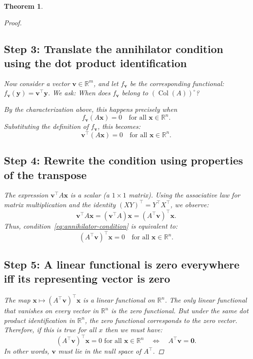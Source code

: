 \documentclass[11pt]{article}
\newcommand{\col}{\operatorname{Col}}
\newcommand{\R}{\mathbb{R}}
\newtheorem{theorem}{Theorem}
\begin{document}
\begin{theorem}
\begin{proof}
\subsection*{Step 3: Translate the annihilator condition using the dot product identification}

Now consider a vector $\mathbf{v} \in \R^m$, and let $f_{\mathbf{v}}$ be the corresponding functional: $f_{\mathbf{v}}(\mathbf{y}) = \mathbf{v}^\top \mathbf{y}$.  
We ask: \textit{When does $f_{\mathbf{v}}$ belong to $(\col(A))^\circ$?}

By the characterization above, this happens precisely when
\[
f_{\mathbf{v}}(A\mathbf{x}) = 0 \quad \text{for all } \mathbf{x} \in \R^n.
\]
Substituting the definition of $f_{\mathbf{v}}$, this becomes:
\begin{equation}
\label{eq:annihilator-condition}
\mathbf{v}^\top (A\mathbf{x}) = 0 \quad \text{for all } \mathbf{x} \in \R^n.
\end{equation}

\subsection*{Step 4: Rewrite the condition using properties of the transpose}

The expression $\mathbf{v}^\top A \mathbf{x}$ is a scalar (a $1 \times 1$ matrix). Using the associative law for matrix multiplication and the identity $(XY)^\top = Y^\top X^\top$, we observe:
\[
\mathbf{v}^\top A \mathbf{x} = (\mathbf{v}^\top A) \mathbf{x} = (A^\top \mathbf{v})^\top \mathbf{x}.
\]
Thus, condition~\eqref{eq:annihilator-condition} is equivalent to:
\[
(A^\top \mathbf{v})^\top \mathbf{x} = 0 \quad \text{for all } \mathbf{x} \in \R^n.
\]

\subsection*{Step 5: A linear functional is zero everywhere iff its representing vector is zero}

The map $\mathbf{x} \mapsto (A^\top \mathbf{v})^\top \mathbf{x}$ is a linear functional on $\R^n$. The only linear functional that vanishes on \textit{every} vector in $\R^n$ is the zero functional. But under the same dot product identification in $\R^n$, the zero functional corresponds to the zero vector. Therefore, if this is true for all $x$ then we must have:
\[
(A^\top \mathbf{v})^\top \mathbf{x} = 0 \text{ for all } \mathbf{x} \in \R^n \quad \Longleftrightarrow \quad A^\top \mathbf{v} = \mathbf{0}.
\]
In other words, $\mathbf{v}$ must lie in the null space of $A^\top$.


\end{proof}
\end{theorem}
\end{document}
